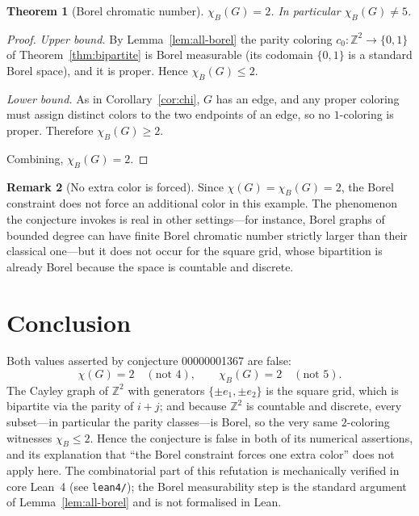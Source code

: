 \documentclass[11pt]{article}
\newtheorem{theorem}{Theorem}
\theoremstyle{definition}
\newtheorem{remark}[theorem]{Remark}
\begin{document}
\begin{theorem}[Borel chromatic number]
\label{thm:borel}
$\chi_B(G)=2$. In particular $\chi_B(G)\neq 5$.
\end{theorem}

\begin{proof}
\emph{Upper bound.} By Lemma~\ref{lem:all-borel} the parity coloring
$c_0\colon\mathbb{Z}^2\to\{0,1\}$ of Theorem~\ref{thm:bipartite} is Borel
measurable (its codomain $\{0,1\}$ is a standard Borel space), and it is proper.
Hence $\chi_B(G)\le 2$.

\emph{Lower bound.} As in Corollary~\ref{cor:chi}, $G$ has an edge, and any
proper coloring must assign distinct colors to the two endpoints of an edge, so
no $1$-coloring is proper. Therefore $\chi_B(G)\ge 2$.

Combining, $\chi_B(G)=2$.
\end{proof}

\begin{remark}[No extra color is forced]
Since $\chi(G)=\chi_B(G)=2$, the Borel constraint does not force an additional
color in this example. The phenomenon the conjecture invokes is real in other
settings---for instance, Borel graphs of bounded degree can have finite Borel
chromatic number strictly larger than their classical one---but it does not
occur for the square grid, whose bipartition is already Borel because the space
is countable and discrete.
\end{remark}

\section{Conclusion}

Both values asserted by conjecture 00000001367 are false:
\[
\chi(G)=2\quad(\text{not }4),\qquad \chi_B(G)=2\quad(\text{not }5).
\]
The Cayley graph of $\mathbb{Z}^2$ with generators $\{\pm e_1,\pm e_2\}$ is the
square grid, which is bipartite via the parity of $i+j$; and because
$\mathbb{Z}^2$ is countable and discrete, every subset---in particular the
parity classes---is Borel, so the very same $2$-coloring witnesses
$\chi_B\le 2$. Hence the conjecture is false in both of its numerical
assertions, and its explanation that ``the Borel constraint forces one extra
color'' does not apply here. The combinatorial part of this refutation is
mechanically verified in core Lean~4 (see \texttt{lean4/}); the Borel
measurability step is the standard argument of Lemma~\ref{lem:all-borel} and is
not formalised in Lean.
\end{document}
